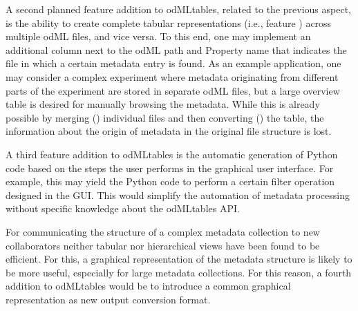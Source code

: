 {A second planned feature addition to odMLtables, related to the previous aspect, is the ability to create complete tabular representations (i.e., feature \fconvert) across multiple odML files, and vice versa. To this end, one may implement an additional column next to the odML path and Property name that indicates the file in which a certain metadata entry is found. As an example application, one may consider a complex experiment where metadata originating from different parts of the experiment are stored in separate odML files, but a large overview table is desired for manually browsing the metadata. While this is already possible by merging (\fmerge) individual files and then converting (\fconvert) the table, the information about the origin of metadata in the original file structure is lost.

A third feature addition to odMLtables is the automatic generation of Python code based on the steps the user performs in the graphical user interface. For example, this may yield the Python code to perform a certain filter operation designed in the GUI. This would simplify the automation of metadata processing without specific knowledge about the odMLtables API.

For communicating the structure of a complex metadata collection to new collaborators neither tabular nor hierarchical views have been found to be efficient. For this, a graphical representation of the metadata structure is likely to be more useful, especially for large metadata collections. For this reason, a fourth addition to odMLtables would be to introduce a common graphical representation as new output conversion format.

}
